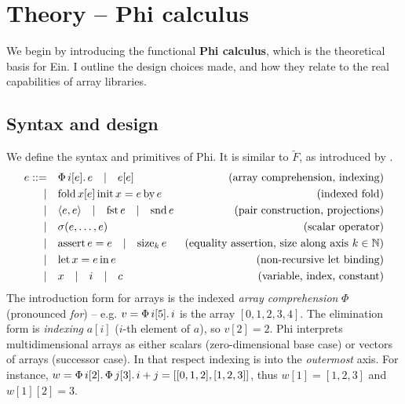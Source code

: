 \newpage
\section{Theory -- Phi calculus}
\label{phi-calculus}

We begin by introducing the functional \textbf{Phi calculus}, which is the theoretical basis for Ein. I outline the design choices made, and how they relate to the real capabilities of array libraries.

\subsection{Syntax and design}

\newcommand{\philet}[3]{\mathrm{let}\,{#1}={#2}\,\mathrm{in}\,{#3}}
\newcommand{\phivec}[3]{\Phi\, {#1}[{#2}] \ldotp {#3}}
\newcommand{\phifold}[5]{\mathrm{fold}\,{#1}[{#2}]\,\mathrm{init}\,{#3} = {#4}\,\mathrm{by}\,{#5}}
\newcommand{\phipair}[2]{\left\langle {#1}, {#2} \right\rangle}
\newcommand{\phifst}[1]{\mathrm{fst}\,{#1}}
\newcommand{\phisnd}[1]{\mathrm{snd}\,{#1}}
\newcommand{\phisize}[2]{\mathrm{size}_{#2}\, {#1}}
\newcommand{\phiasserteq}[2]{\mathrm{assert}\,{#1}={#2}}

We define the syntax and primitives of Phi. It is similar to $\tilde F$, as introduced by \textcite{shaikhha2019efficient}.
\begin{align*}
e ::=&\quad \phivec{i}{e}{e} \quad|\quad e[e]   &\text{(array comprehension, indexing)} \\
|&\quad \phifold{x}{e}{x}{e}{e}  &\text{(indexed fold)} \\
|&\quad \phipair{e}{e} \quad|\quad \phifst{e} \quad|\quad \phisnd{e} &\text{(pair construction, projections)} \\
|&\quad \sigma(e, \dots, e) &\text{(scalar operator)} \\
|&\quad \phiasserteq{e}{e} \quad|\quad \phisize{e}{k} &\text{(equality assertion, size along axis } k \in \mathbb N \text{)} \\
|&\quad \philet{x}{e}{e} &\text{(non-recursive let binding)} \\
|&\quad x \quad|\quad i \quad|\quad c &\text{(variable, index, constant)}
\end{align*}
The introduction form for arrays is the indexed \textit{array comprehension} $\Phi$ (pronounced \textit{for}) -- e.g. $v = \phivec{i}{5}{i}$ is the array $[0, 1, 2, 3, 4]$. The elimination form is \textit{indexing} $a[i]$ ($i$-th element of $a$), so $v[2] = 2$. Phi interprets multidimensional arrays as either scalars (zero-dimensional base case) or vectors of arrays (successor case). In that respect indexing is into the \textit{outermost} axis. For instance, $w = \phivec{i}{2}{\phivec{j}{3}{i+j}} = [[0, 1, 2], [1, 2, 3]]$, thus $w[1] = [1, 2, 3]$ and $w[1][2] = 3$.

